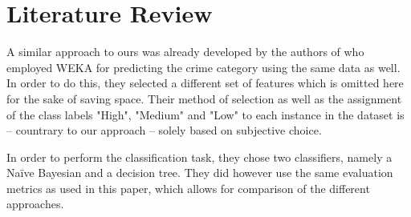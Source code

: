\section{Literature Review}
A similar approach to ours was already developed by the authors of
\cite{indian} who employed WEKA for predicting the crime category
using the same data as well. In order to do this, they selected a
different set of features which is omitted here for the sake of saving
space. Their method of selection as well as the assignment of the
class labels "High", "Medium" and "Low" to each instance in the
dataset is -- countrary to our approach -- solely based on subjective
choice.

In order to perform the classification task, they chose two
classifiers, namely a Na\"ive Bayesian and a decision tree. They did
however use the same evaluation metrics as used in this paper, which
allows for comparison of the different approaches.\\



